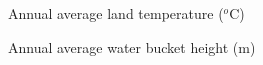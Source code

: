 \documentclass[10pt,a4paper]{report}
\begin{document}
\begin{figure}
\centerline{}
\caption{Annual average land temperature
($^{o}$C)}\label{landtemp}
\end{figure}

\begin{figure}
\centerline{}
\caption{Annual average water bucket height (m)}\label{water}
\end{figure}
\end{document}
